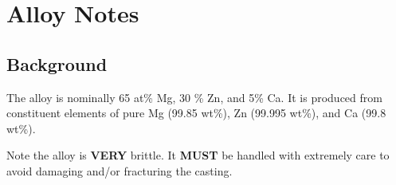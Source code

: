 \section{\MgZnCa Alloy Notes}

\subsection{Background}

The \MgZnCa alloy is nominally 65 at\% Mg, 30 \% Zn, and 5\% Ca. It is produced from constituent elements of pure Mg (99.85 wt\%), Zn (99.995 wt\%), and Ca (99.8 wt\%). 

Note the \MgZnCa alloy is \textbf{VERY} brittle. It \textbf{MUST} be handled with extremely care to avoid damaging and/or fracturing the casting.


